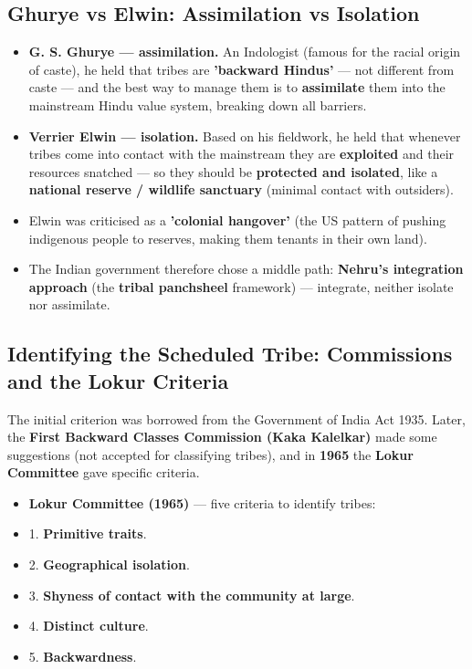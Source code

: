 \subsection{Ghurye vs Elwin: Assimilation vs Isolation}

\begin{ComparisonBox}
\begin{itemize}
\item \textbf{G. S. Ghurye --- assimilation.} An Indologist (famous for the racial origin of caste), he held that tribes are \textbf{'backward Hindus'} --- not different from caste --- and the best way to manage them is to \textbf{assimilate} them into the mainstream Hindu value system, breaking down all barriers.
\item \textbf{Verrier Elwin --- isolation.} Based on his fieldwork, he held that whenever tribes come into contact with the mainstream they are \textbf{exploited} and their resources snatched --- so they should be \textbf{protected and isolated}, like a \textbf{national reserve / wildlife sanctuary} (minimal contact with outsiders).
\item Elwin was criticised as a \textbf{'colonial hangover'} (the US pattern of pushing indigenous people to reserves, making them tenants in their own land).
\item The Indian government therefore chose a middle path: \textbf{Nehru's integration approach} (the \textbf{tribal panchsheel} framework) --- integrate, neither isolate nor assimilate.
\end{itemize}
\end{ComparisonBox}

\subsection{Identifying the Scheduled Tribe: Commissions and the Lokur Criteria}

The initial criterion was borrowed from the Government of India Act 1935. Later, the \textbf{First Backward Classes Commission (Kaka Kalelkar)} made some suggestions (not accepted for classifying tribes), and in \textbf{1965} the \textbf{Lokur Committee} gave specific criteria.

\begin{GovtPolicy}
\begin{itemize}
\item \textbf{Lokur Committee (1965)} --- five criteria to identify tribes:
\item 1. \textbf{Primitive traits}.
\item 2. \textbf{Geographical isolation}.
\item 3. \textbf{Shyness of contact with the community at large}.
\item 4. \textbf{Distinct culture}.
\item 5. \textbf{Backwardness}.
\end{itemize}
\end{GovtPolicy}

